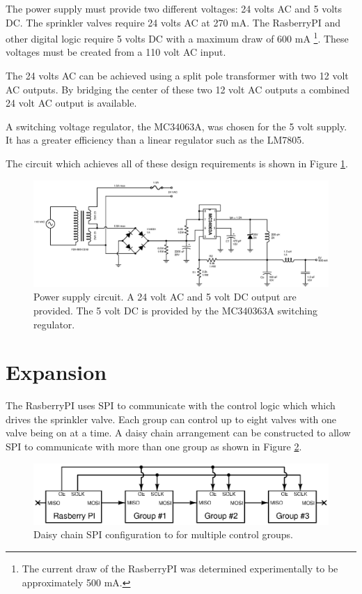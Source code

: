 \documentclass{article}
\begin{document}
The power supply must provide two different voltages: 24 volts AC and
5 volts DC.
The sprinkler valves require 24 volts AC at 270 mA.
The RasberryPI and other digital logic require 5 volts DC with a
maximum draw of 600 mA
\footnote{The current draw of the RasberryPI was determined
experimentally to be approximately 500 mA.}.
These voltages must be created from a 110 volt AC input.

The 24 volts AC can be achieved using a split pole transformer
with two 12 volt AC outputs.
By bridging the center of these two 12 volt AC outputs
a combined 24 volt AC output is available.

A switching voltage regulator, the MC34063A, was chosen for
the 5 volt supply.
It has a greater efficiency than a linear regulator such as
the LM7805.

The circuit which achieves all of these design requirements is
shown in Figure \ref{fig:power}.

\begin{figure}[hbp]
\centering
\includegraphics[angle=90,scale=0.75]{xcircuit/power_supply}
\caption{Power supply circuit. A 24 volt AC and 5 volt DC output are
provided.  The 5 volt DC is provided by the MC340363A switching
regulator.}\label{fig:power}
\end{figure}


\clearpage
\section{Expansion}
\label{sec:expansion}

The RasberryPI uses SPI to communicate with the
control logic which which drives the sprinkler valve.
Each group can control up to eight valves with one valve
being on at a time.
A daisy chain arrangement can be constructed to allow SPI
to communicate with more than one group as shown in
Figure \ref{fig:expansion_spi}.

\begin{figure}[hbp]
\centering
\includegraphics[angle=0,scale=0.80]{xcircuit/expansion_spi}
\caption{Daisy chain SPI configuration to for multiple control groups.
}\label{fig:expansion_spi}
\end{figure}
\end{document}
